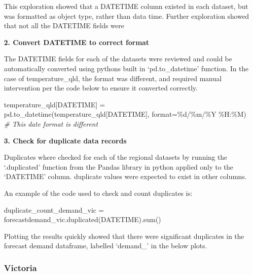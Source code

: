 \documentclass[mstat,12pt]{unswthesis}
\newenvironment{Shaded}{}{}
\newcommand{\BuiltInTok}[1]{\textcolor[rgb]{0.00,0.50,0.00}{#1}}
\newcommand{\CommentTok}[1]{\textcolor[rgb]{0.38,0.63,0.69}{\textit{#1}}}
\newcommand{\NormalTok}[1]{#1}
\newcommand{\OperatorTok}[1]{\textcolor[rgb]{0.40,0.40,0.40}{#1}}
\newcommand{\SpecialCharTok}[1]{\textcolor[rgb]{0.25,0.44,0.63}{#1}}
\newcommand{\StringTok}[1]{\textcolor[rgb]{0.25,0.44,0.63}{#1}}
\begin{document}
This exploration showed that a DATETIME column existed in each dataset,
but was formatted as object type, rather than data time. Further
exploration showed that not all the DATETIME fields were

\textbf{2. Convert DATETIME to correct format}

The DATETIME fields for each of the datasets were reviewed and could be
automatically converted using pythons built in `pd.to\_datetime'
function. In the case of temperature\_qld, the format was different, and
required manual intervention per the code below to ensure it converted
correctly.

\begin{Shaded}
\begin{Highlighting}[]
\NormalTok{temperature\_qld[}\StringTok{\textquotesingle{}DATETIME\textquotesingle{}}\NormalTok{] }\OperatorTok{=}\NormalTok{ pd.to\_datetime(temperature\_qld[}\StringTok{\textquotesingle{}DATETIME\textquotesingle{}}\NormalTok{], }\BuiltInTok{format}\OperatorTok{=}\StringTok{\textquotesingle{}}\SpecialCharTok{\%d}\StringTok{/\%m/\%Y \%H:\%M\textquotesingle{}}\NormalTok{) }
\CommentTok{\# This date format is different}
\end{Highlighting}
\end{Shaded}

\textbf{3. Check for duplicate data records}

Duplicates where checked for each of the regional datasets by running
the `.duplicated' function from the Pandas library in python applied
only to the `DATETIME' column. duplicate values were expected to exist
in other columns.

An example of the code used to check and count duplicates is:

\begin{Shaded}
\begin{Highlighting}[]
\NormalTok{duplicate\_count\_demand\_vic }\OperatorTok{=}\NormalTok{ forecastdemand\_vic.duplicated(}\StringTok{\textquotesingle{}DATETIME\textquotesingle{}}\NormalTok{).}\BuiltInTok{sum}\NormalTok{()}
\end{Highlighting}
\end{Shaded}

Plotting the results quickly showed that there were significant
duplicates in the forecast demand dataframe, labelled `demand\_' in the
below plots.

\subsubsection{Victoria}\label{victoria}
\end{document}

